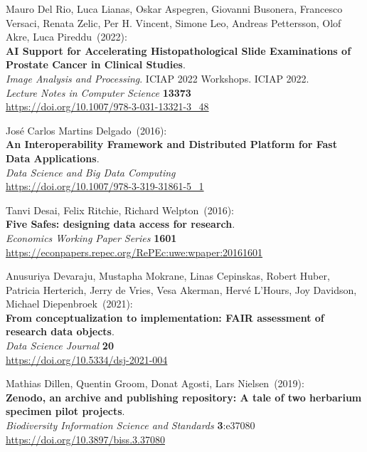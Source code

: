 \begin{thebibliography}{9}
Mauro Del Rio, Luca Lianas, Oskar Aspegren, Giovanni Busonera, Francesco Versaci, Renata Zelic, Per H. Vincent, Simone Leo, Andreas Pettersson, Olof Akre, Luca Pireddu~(2022): \\
\textbf{AI Support for Accelerating Histopathological Slide Examinations of Prostate Cancer in Clinical Studies}.\\
\emph{Image Analysis and Processing}. ICIAP 2022 Workshops. ICIAP 2022. \\
\emph{Lecture Notes in Computer Science} \textbf{13373}\\
\url{https://doi.org/10.1007/978-3-031-13321-3_48}

José Carlos Martins Delgado~(2016): \\
\textbf{An Interoperability Framework and Distributed Platform for Fast Data Applications}.\\
\emph{Data Science and Big Data Computing} \\
\url{https://doi.org/10.1007/978-3-319-31861-5_1}

Tanvi Desai, Felix Ritchie, Richard Welpton~(2016): \\
\textbf{Five Safes: designing data access for research}.\\
\emph{Economics Working Paper Series} \textbf{1601}\\
\url{https://econpapers.repec.org/RePEc:uwe:wpaper:20161601}

Anusuriya Devaraju, Mustapha Mokrane, Linas Cepinskas, Robert Huber,
Patricia Herterich, Jerry de Vries, Vesa Akerman, Hervé L'Hours, Joy
Davidson, Michael Diepenbroek~(2021): \\
\textbf{From conceptualization to implementation: FAIR assessment of research data objects}. \\
\emph{Data Science Journal} \textbf{20} \\
\url{https://doi.org/10.5334/dsj-2021-004}

Mathias Dillen, Quentin Groom, Donat Agosti, Lars Nielsen~(2019): \\
\textbf{Zenodo, an archive and publishing repository: A tale of two
herbarium specimen pilot projects}.\\
\emph{Biodiversity Information Science and Standards} \textbf{3}:e37080\\
\url{https://doi.org/10.3897/biss.3.37080}


\end{thebibliography}
